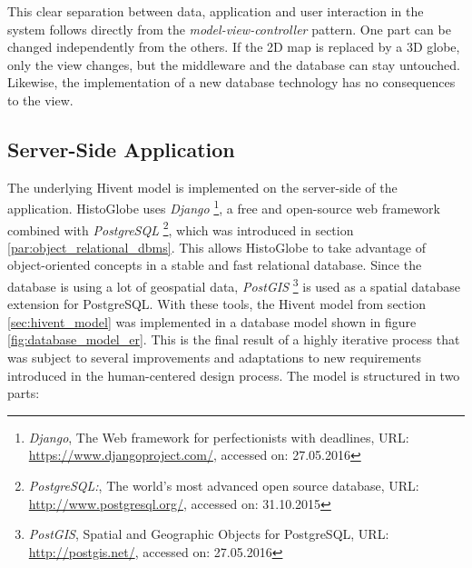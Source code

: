 This clear separation between data, application and user interaction in the system follows directly from the \emph{model-view-controller} pattern. One part can be changed independently from the others. If the 2D map is replaced by a 3D globe, only the view changes, but the middleware and the database can stay untouched. Likewise, the implementation of a new database technology has no consequences to the view.


\subsection{Server-Side Application} %
\label{sub:server_side_application}

The underlying Hivent model is implemented on the server-side of the application. HistoGlobe uses \emph{Django}
\footnote{
  \emph{Django},
  The Web framework for perfectionists with deadlines,
  URL: \url{https://www.djangoproject.com/},
  accessed on: 27.05.2016
},
a free and open-source web framework combined with \emph{PostgreSQL}
\footnote{
  \emph{PostgreSQL:},
  The world's most advanced open source database,
  URL: \url{http://www.postgresql.org/},
  accessed on: 31.10.2015
},
which was introduced in section \ref{par:object_relational_dbms}. This allows HistoGlobe to take advantage of object-oriented concepts in a stable and fast relational database. Since the database is using a lot of geospatial data, \emph{PostGIS}
\footnote{
  \emph{PostGIS},
  Spatial and Geographic Objects for PostgreSQL,
  URL: \url{http://postgis.net/},
  accessed on: 27.05.2016
}
is used as a spatial database extension for PostgreSQL. With these tools, the Hivent model from section \ref{sec:hivent_model}  was implemented in a database model shown in figure \ref{fig:database_model_er}. This is the final result of a highly iterative process that was subject to several improvements and adaptations to new requirements introduced in the human-centered design process. The model is structured in two parts:

